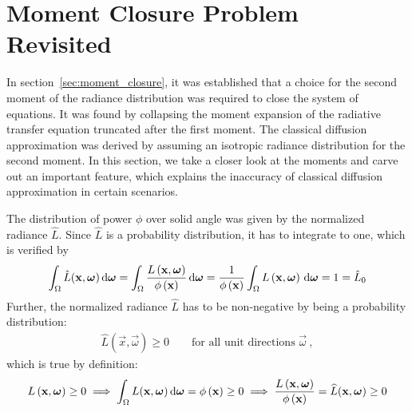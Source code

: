 \section{Moment Closure Problem Revisited}
\label{sec:moment_problem_revisited}

In section~\ref{sec:moment_closure}, it was established that a choice for the second moment of the radiance distribution was required to close the system of equations. It was found by collapsing the moment expansion of the radiative transfer equation truncated after the first moment. The classical diffusion approximation was derived by assuming an isotropic radiance distribution for the second moment. In this section, we take a closer look at the moments and carve out an important feature, which explains the inaccuracy of classical diffusion approximation in certain scenarios.

The distribution of power $\phi$ over solid angle was given by the normalized radiance $\widehat{L}$. Since $\widehat{L}$ is a probability distribution, it has to integrate to one, which is verified by
\begin{align*}
\int_{\Omega}{\hat{L}(\boldsymbol{\mathbf{x}}, \boldsymbol{\mathbf{\omega}})\,\mathrm{d}\boldsymbol{\mathbf{\omega}}}=
\int_{\Omega}{\frac{L\left(\boldsymbol{\mathbf{x}}, \boldsymbol{\mathbf{\omega}}\right)}{\phi\left(\boldsymbol{\mathbf{x}}\right)}\,\mathrm{d}\boldsymbol{\mathbf{\omega}}}=
\frac{1}{\phi\left(\boldsymbol{\mathbf{x}}\right)}
\int_{\Omega}{L\left(\boldsymbol{\mathbf{x}}, \boldsymbol{\mathbf{\omega}}\right)\,\mathrm{d}\boldsymbol{\mathbf{\omega}}}
=1
=\hat{L}_0
\end{align*}
Further, the normalized radiance $\widehat{L}$ has to be non-negative by being a probability distribution:
\begin{align*}
\hat{L}(\vec{x}, \vec{\omega})\ge 0 \qquad \text{for all unit directions } \vec{\omega}
\ ,
\end{align*}
which is true by definition:
\begin{align*}
L\left(\boldsymbol{\mathbf{x}}, \boldsymbol{\mathbf{\omega}}\right) \ge 0
\implies
\int_{\Omega}{L(\boldsymbol{\mathbf{x}}, \boldsymbol{\mathbf{\omega}})\,\mathrm{d}\boldsymbol{\mathbf{\omega}}}=\phi\left(\boldsymbol{\mathbf{x}}\right)\ge 0
\implies
\frac{L\left(\boldsymbol{\mathbf{x}}, \boldsymbol{\mathbf{\omega}}\right)}{\phi\left(\boldsymbol{\mathbf{x}}\right)}=\widehat{L}(\boldsymbol{\mathbf{x}}, \boldsymbol{\mathbf{\omega}}) \ge 0
\end{align*}

